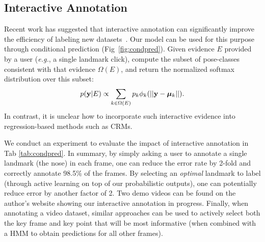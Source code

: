 \documentclass[letterpaper]{article} %
\newcommand{\eg}{\textit{e.g.}}
\newcommand{\ie}{\textit{i.e.}}
\begin{document}
\subsection{Interactive Annotation}
\label{sec:interactive}
Recent work has suggested that interactive annotation can significantly improve the efficiency of labeling new datasets~\cite{le2012interactive}. Our model can be used for this purpose through conditional prediction (Fig~\ref{fig:condpred}). Given evidence $E$ provided by a user (\eg, a single landmark click), compute the subset of pose-classes consistent with that evidence $\Omega(E)$, and return the normalized softmax distribution over this subset:
\begin{align}
   p({\bf y}|E) \propto \sum_{k \in \Omega(E)}  p_k \phi_k(||{\bf y}-{\bm \mu}_k||).
\end{align}
In contrast, it is unclear how to incorporate such interactive evidence into regression-based methods such as CRMs.

We conduct an experiment to evaluate the impact of interactive annotation in Tab \ref{tab:condpred}. In summary, by simply asking a user to annotate a single landmark (the nose) in each frame, one can reduce the error rate by 2-fold and correctly annotate 98.5\% of the frames. By selecting an {\em optimal} landmark to label (through active learning on top of our probabilistic outputs), one can potentially reduce error by another factor of 2. Two demo videos can be found on the author's website showing our interactive annotation in progress.
Finally, when annotating a video dataset, similar approaches can be used to actively select both the key frame and key point that will be most informative (when combined with a HMM to obtain predictions for all other frames).
\end{document}
